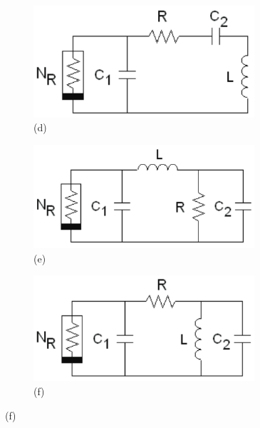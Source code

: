 \documentclass[12pt]{article}
\begin{document}
\begin{figure}[H]
\begin{subfigure}[b]{0.5\textwidth}
		\centering
		\includegraphics[width=0.9\textwidth]{Images/fig1(d).png}
		\caption{(d)}
		\label{fig:1d}
	\end{subfigure}
	\begin{subfigure}[b]{0.5\textwidth}
		\centering
		\includegraphics[width=0.9\textwidth]{Images/fig1(e).png}
		\caption{(e)}
		\label{fig:1e}
	\end{subfigure}%
	\begin{subfigure}[b]{0.5\textwidth}
		\centering
		\includegraphics[width=0.9\textwidth]{Images/fig1(f).png}
		\caption{(f)}
		\label{fig:1f}
	\end{subfigure}
\end{figure}
\end{document}
